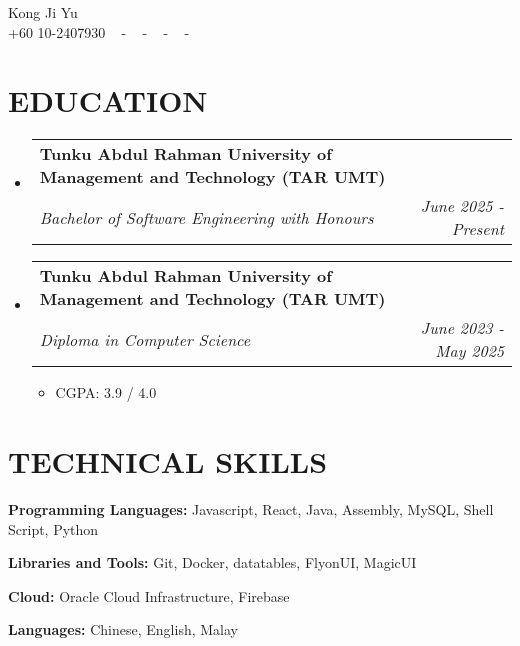 \documentclass[letterpaper,11pt]{article}
\makeatletter
\newcommand{\resumeItem}[1]{
  \item\small{
    {#1 \vspace{-1pt}}
  }
}
\newcommand{\resumeSubheading}[4]{
  \vspace{-2pt}\item
    \begin{tabular*}{1.0\textwidth}[t]{l@{\extracolsep{\fill}}r}
      \textbf{\large#1} & \textbf{\small #2} \\
      \textit{\large#3} & \textit{\small #4} \\
      
    \end{tabular*}\vspace{-7pt}
}
\newcommand{\resumeSubHeadingListStart}{\begin{itemize}[leftmargin=0.0in, label={}]}
\newcommand{\resumeSubHeadingListEnd}{\end{itemize}}
\newcommand{\resumeItemListStart}{\begin{itemize}[leftmargin=0.1in]}
\newcommand{\resumeItemListEnd}{\end{itemize}\vspace{-5pt}}
\makeatother
\begin{document}


\begin{center}
    {\huge Kong Ji Yu} \\ \vspace{2pt} 
    {+60 10-2407930} ~ 
    \small{-}
    \href{https://www.overleaf.com/read/pknmtygnwbzx#9ef4bb}{\color{blue}{Portfolio}} ~ 
    \small{-}
    \href{mailto:kongjiyu0198@gmail.com}{\color{blue}{kongjiyu0198@gmail.com}} ~ 
    \small{-}
    \href{https://www.linkedin.com/in/ji-yu-kong-249516279/}{ \color{blue}{linkedin.com/in/kongjiyu}}  ~
    \small{-}
    \href{https://github.com/kongjiyu}{ \color{blue}{github.com/kongjiyu}} ~
    \vspace{-7pt}
\end{center}

\section{\color{airforceblue}EDUCATION}
  \resumeSubHeadingListStart
  \resumeSubheading
      {Tunku Abdul Rahman University of Management and Technology (TAR UMT)}{}
      {Bachelor of Software Engineering with Honours}{June 2025 - Present}
    

    \vspace{-4pt}
     \resumeSubheading
      {Tunku Abdul Rahman University of Management and Technology (TAR UMT)
}{}
      {Diploma in Computer Science}{June 2023 - May 2025}
        \resumeItemListStart
    \resumeItem{CGPA: 3.9 / 4.0}
  \resumeItemListEnd
  \resumeSubHeadingListEnd
  \vspace{-10pt}

\section{\color{airforceblue}TECHNICAL SKILLS}
 \begin{itemize}[leftmargin=0in, label={}]
    \small{\item{
     \textbf{\normalsize{Programming Languages:}}{ \normalsize{Javascript, React, Java, Assembly, MySQL, Shell Script, Python}} \\
      \vspace{1.2pt}
      
     \textbf{\normalsize{Libraries and Tools:}}{ \normalsize{Git, Docker, datatables, FlyonUI, MagicUI}} \\
      \vspace{1.2pt}
      
     \textbf{\normalsize{Cloud:}}{ \normalsize{Oracle Cloud Infrastructure, Firebase}} \\
     \vspace{1.2pt}

     \textbf{\normalsize{Languages:}}{ \normalsize{Chinese, English, Malay}}

     }}
 \end{itemize}
 \vspace{-16pt}
 
\end{document}
